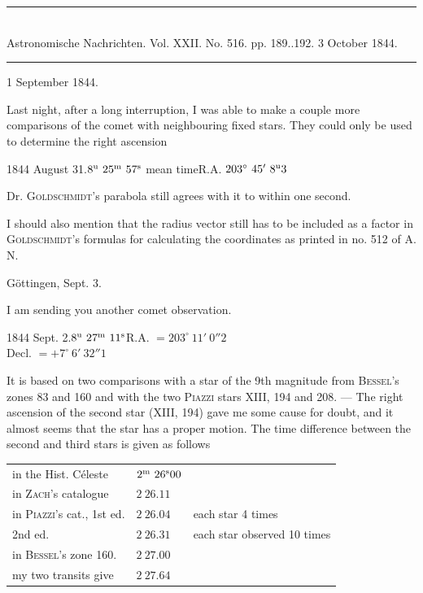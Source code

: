 \clearpage
\hypertarget{native-473-lower}{}
\begin{center}
\rule{0.55\linewidth}{0.4pt}\\[2pt]
Astronomische Nachrichten. Vol. XXII. No. 516. pp. 189..192. 3 October 1844.\\[2pt]
\rule{0.55\linewidth}{0.4pt}
\end{center}
\begin{flushright}1 September 1844.\end{flushright}

Last night, after a long interruption, I was able to make a couple more comparisons of the comet with neighbouring fixed stars. They could only be used to determine the right ascension

\begin{center}
1844 August 31.\quad $8^{\rm u}\ 25^{\rm m}\ 57^{\rm s}$ mean time\quad R.A. $203^\circ\ 45'\ 8^{\rm u}3$
\end{center}

Dr. \textsc{Goldschmidt}’s parabola still agrees with it to within one second.

I should also mention that the radius vector still has to be included as a factor in \textsc{Goldschmidt}’s formulas for calculating the coordinates as printed in no. 512 of A. N.

\begin{flushright}Göttingen, Sept. 3.\end{flushright}

I am sending you another comet observation.

\begin{center}
1844 Sept. 2.\quad $8^{\rm u}\ 27^{\rm m}\ 11^{\rm s}$\quad R.A. $=203^\circ\ 11'\ 0''2$\\[2pt]
Decl. $=+7^\circ\ 6'\ 32''1$
\end{center}

It is based on two comparisons with a star of the 9th magnitude from \textsc{Bessel}’s zones 83 and 160 and with the two \textsc{Piazzi} stars XIII, 194 and 208. --- The right ascension of the second star (XIII, 194) gave me some cause for doubt, and it almost seems that the star has a proper motion. The time difference between the second and third stars is given as follows

\begin{center}
\setlength{\tabcolsep}{3pt}
\begin{tabular}{lll}
in the Hist. Céleste & $2^{\rm m}\ 26^{\rm s}00$ & \\
in \textsc{Zach}’s catalogue & $2\ 26.11$ & \\
in \textsc{Piazzi}’s cat., 1st ed. & $2\ 26.04$ & each star 4 times \\
\hphantom{in \textsc{Piazzi}’s cat., }2nd ed. & $2\ 26.31$ & each star observed 10 times \\
in \textsc{Bessel}’s zone 160. & $2\ 27.00$ & \\
my two transits give & $2\ 27.64$ & \\
\end{tabular}
\end{center}

